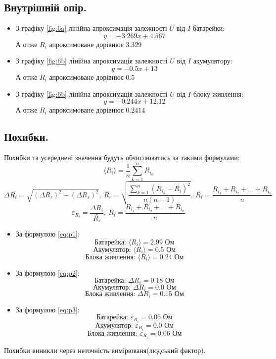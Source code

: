 \documentclass[a4paper,12pt]{article}
\begin{document}
\begin{justify}
	\subsection{Внутрішній опір.}
	\begin{itemize}
		\item З графіку \ref{fig:6a} лінійна апроксимація залежності $U$ від $I$ батарейки: $$y=-3.269 x + 4.567$$ А отже $R_i$ апроксимоване дорівнює $3.329$
		\item З графіку \ref{fig:6b} лінійна апроксимація залежності $U$ від $I$ акумулятору: $$y=-0.5 x + 13$$  А отже $R_i$ апроксимоване дорівнює $0.5$
		\item З графіку \ref{fig:6b} лінійна апроксимація залежності $U$ від $I$ блоку живлення: $$y=-0.244 x + 12.12$$ А отже $R_i$ апроксимоване дорівнює $0.2414$
	\end{itemize}\subsection{Похибки.}
	Похибки та усереднені значення будуть обчислюватись за такими формулами:
	\begin{equation}\label{eq:p1}
		\langle R_i\rangle=\dfrac1n\sum_{k=1}^{n}R_{i_k}
	\end{equation}
	\begin{equation}\label{eq:p2}
		\Delta R_i=\sqrt{(\Delta R_r)^2+(\Delta R_s)^2},\>R_r=\sqrt{\dfrac{\displaystyle\sum_{k=1}^{n}(R_{i_k}-\bar{R_i})^2}{n(n-1)}},\>\bar{R_i}=\dfrac{R_{i_1}+R_{i_2}+\dots+R_{i_n}}{n}
	\end{equation}	
	\begin{equation}\label{eq:p3}
		\varepsilon_{R_i}=\dfrac{\Delta R_i}{\bar{R_i}},\>\bar{R_i}=\dfrac{R_{i_1}+R_{i_2}+\dots+R_{i_n}}{n}
	\end{equation}
	\begin{itemize}
		\item За формулою \ref{eq:p1}: $$\textrm{Батарейка: }\langle R_i\rangle=2.99 \textrm{ Ом}$$ $$\textrm{Акумулятор: }\langle R_i\rangle=0.5\textrm{ Ом}$$ $$\textrm{Блока живлення: }\langle R_i\rangle=0.24\textrm{ Ом}$$
		\item За формулою \ref{eq:p2}: $$\textrm{Батарейка: }\Delta R_i=0.18\textrm{ Ом}$$ $$\textrm{Акумулятор: }\Delta R_i=0.0\textrm{ Ом}$$ $$\textrm{Блока живлення: }\Delta R_i=0.15\textrm{ Ом}$$
		\item За формулою \ref{eq:p3}: $$\textrm{Батарейка: }\varepsilon_{R_i}=0.06\textrm{ Ом}$$ $$\textrm{Акумулятор: }\varepsilon_{R_i}=0.0\textrm{ Ом}$$ $$\textrm{Блока живлення: }\varepsilon_{R_i}=0.06\textrm{ Ом}$$
	\end{itemize}
	Похибки виникли через неточність вимірюваня(людський фактор). 
\newpage

\end{justify}
\end{document}
